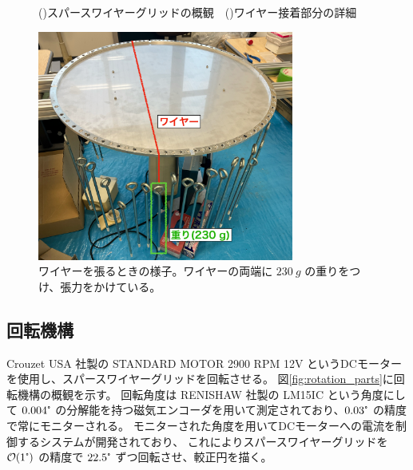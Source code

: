 \documentclass[../../main.tex]{subfiles}
\begin{document}
\begin{figure}[H]
\begin{minipage}[b]{0.48\columnwidth}
        \subcaption{}
        \label{fig:wire_detail_view}
    \end{minipage}
    \caption{()スパースワイヤーグリッドの概観~\cite{swg:Murata_2023}\ ()ワイヤー接着部分の詳細}
    \label{fig:swg}
\end{figure}
\begin{figure}[H]
    \centering
    \includegraphics[width=0.75\textwidth]{wiregrid/wire_attachment.pdf}
    \caption[ワイヤーを張るときの様子]{ワイヤーを張るときの様子。ワイヤーの両端に $\SI{230}{g}$ の重りをつけ、張力をかけている。}
    \label{fig:wire_attachment}
\end{figure}
\subsection{回転機構}
Crouzet USA 社製の STANDARD MOTOR 2900 RPM 12V というDCモーターを使用し、スパースワイヤーグリッドを回転させる。
図\ref{fig:rotation_parts}に回転機構の概観を示す。
回転角度は RENISHAW 社製の LM15IC という角度にして $0.004\tcdegree$ の分解能を持つ磁気エンコーダを用いて測定されており、$0.03\tcdegree$ の精度で常にモニターされる。
モニターされた角度を用いてDCモーターへの電流を制御するシステムが開発されており、
これによりスパースワイヤーグリッドを$\order{1\tcdegree}$ の精度で $22.5\tcdegree$ ずつ回転させ、較正円を描く\cite{swg:nakata}。
\end{document}
